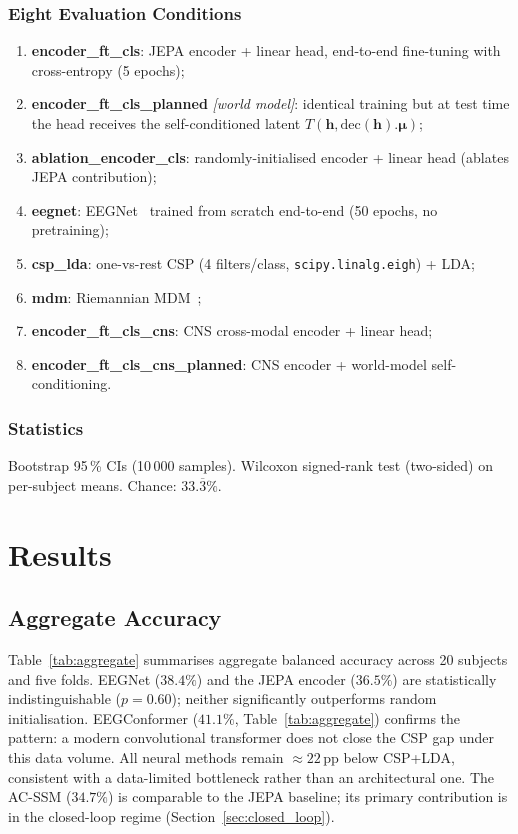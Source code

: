 \documentclass[journal]{IEEEtran}
\begin{document}
\subsubsection{Eight Evaluation Conditions}
\begin{enumerate}
  \item \textbf{encoder\_ft\_cls}: JEPA encoder + linear head, end-to-end fine-tuning with cross-entropy (5 epochs);
  \item \textbf{encoder\_ft\_cls\_planned} \emph{[world model]}: identical training but at test time the head receives the self-conditioned latent $T(\mathbf{h}, \text{dec}(\mathbf{h}).\bm\mu)$;
  \item \textbf{ablation\_encoder\_cls}: randomly-initialised encoder + linear head (ablates JEPA contribution);
  \item \textbf{eegnet}: EEGNet~\cite{lawhern2018eegnet} trained from scratch end-to-end (50 epochs, no pretraining);
  \item \textbf{csp\_lda}: one-vs-rest CSP (4 filters/class, \texttt{scipy.linalg.eigh}) + LDA;
  \item \textbf{mdm}: Riemannian MDM~\cite{barachant2012multiclass};
  \item \textbf{encoder\_ft\_cls\_cns}: CNS cross-modal encoder + linear head;
  \item \textbf{encoder\_ft\_cls\_cns\_planned}: CNS encoder + world-model self-conditioning.
\end{enumerate}

\subsubsection{Statistics}
Bootstrap 95\,\% CIs (10\,000 samples).
Wilcoxon signed-rank test (two-sided) on per-subject means.
Chance: $33.\overline{3}\%$.


\section{Results}
\label{sec:results}

\subsection{Aggregate Accuracy}

Table~\ref{tab:aggregate} summarises aggregate balanced accuracy across 20 subjects and five folds.
EEGNet ($38.4\%$) and the JEPA encoder ($36.5\%$) are statistically indistinguishable ($p=0.60$); neither significantly outperforms random initialisation.
EEGConformer ($41.1\%$, Table~\ref{tab:aggregate}) confirms the pattern: a modern convolutional transformer does not close the CSP gap under this data volume.
All neural methods remain $\approx\!22$\,pp below CSP+LDA, consistent with a data-limited bottleneck rather than an architectural one.
The AC-SSM ($34.7\%$) is comparable to the JEPA baseline; its primary contribution is in the closed-loop regime (Section~\ref{sec:closed_loop}).
\end{document}
